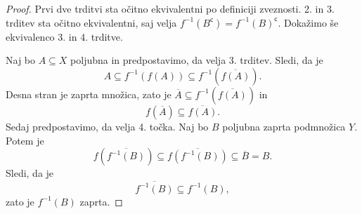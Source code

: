 \begin{proof}
Prvi dve trditvi sta očitno ekvivalentni po definiciji zveznosti.
2. in 3. trditev sta očitno ekvivalentni, saj velja
$f^{-1}(B^\mathsf{c}) = f^{-1}(B)^\mathsf{c}$. Dokažimo še
ekvivalenco 3. in 4. trditve.

Naj bo $A\subseteq X$ poljubna in predpostavimo, da velja 3.
trditev. Sledi, da je
\[
A \subseteq f^{-1}(f(A)) \subseteq f^{-1}(\overline{f(A)}).
\]
Desna stran je zaprta množica, zato je
$\overline{A} \subseteq f^{-1}(\overline{f(A)})$ in
\[
f(\overline{A}) \subseteq \overline{f(A)}.
\]
Sedaj predpostavimo, da velja 4. točka. Naj bo $B$ poljubna zaprta
podmnožica $Y$. Potem je
\[
f(\overline{f^{-1}(B)}) \subseteq \overline{f(f^{-1}(B))}
\subseteq \overline{B} = B.
\]
Sledi, da je
\[
\overline{f^{-1}(B)} \subseteq f^{-1}(B),
\]
zato je $f^{-1}(B)$ zaprta.
\end{proof}

